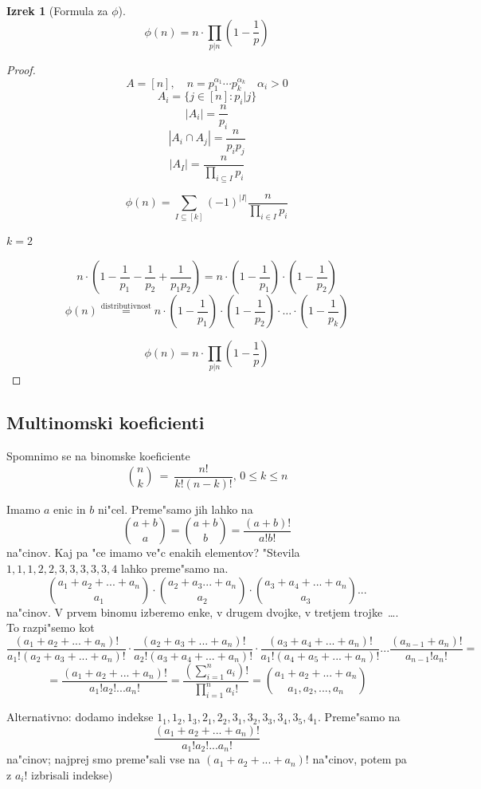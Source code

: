 \documentclass[a4paper,12pt]{article}
\theoremstyle{definition}
\newtheorem{theorem}[counter]{Izrek}
\theoremstyle{remark}
\begin{document}
\begin{theorem}[Formula za $\phi$]
	\[\phi (n) = n \cdot \prod_{p | n} (1 - \frac{1}{p})\]
\end{theorem}
\begin{proof}
	\[A = [n], \quad n = p_1^{\alpha_1} \cdots p_k^{\alpha_k} \quad \alpha_i > 0\]
	\[A_i = \{j \in [n] : p_i | j\} \]
	\[|A_i| = \frac{n}{p_i}\]
	\[|A_i \cap A_j| = \frac{n}{p_i p_j}\]
	\[|A_I| = \frac{n}{\displaystyle \prod_{i \subseteq I} p_i}\]

	\[\phi (n) = \sum_{I \subseteq [k]} (-1)^{|I|} \frac{n}{\displaystyle \prod_{i \in I} p_i}\]

		$k = 2$ \label{TODO: k=2? kasn k? od kje? kaj to pomen}

	\[n\cdot(1 - \frac{1}{p_1} - \frac{1}{p_2} + \frac{1}{p_1 p_2}) = n\cdot(1 - \frac{1}{p_1})\cdot(1 - \frac{1}{p_2})\]
	\[\phi (n) \stackrel{\text{distributivnost}}{=}  n\cdot(1 - \frac{1}{p_1})\cdot(1 - \frac{1}{p_2})\cdot \ldots \cdot(1 - \frac{1}{p_k})\]

	\[\phi (n) = n \cdot \prod_{p | n} (1 - \frac{1}{p})\]
\end{proof}

\subsection{Multinomski koeficienti}
Spomnimo se na binomske koeficiente
\[\binom{n}{k} \ = \ \frac{n!}{k! (n - k)!}\text{, } 0 \leqslant k \leqslant n\]

Imamo $a$ enic in $b$ ni"cel. Preme"samo jih lahko na
\[\binom{a + b}{a} = \binom{a + b}{b} = \frac{(a+b)!}{a!b!}\]
na"cinov. Kaj pa "ce imamo ve"c enakih elementov? "Stevila $1,1,1,2,2,3,3,3,3,3,4$ lahko preme"samo na.
\[\binom{a_1 + a_2 + ... + a_n}{a_1} \cdot \binom{a_2 + a_3 ... + a_n}{a_2} \cdot \binom{a_3 + a_4 + ... + a_n}{a_3} ...\]
na"cinov. V prvem binomu izberemo enke, v drugem dvojke, v tretjem trojke~\ldots. To razpi"semo kot
\[\frac{(a_1 + a_2 + ... + a_n)!}{a_1!(a_2 + a_3 + ... + a_n)!} \cdot \frac{(a_2 + a_3 + ... + a_n)!}{a_2!(a_3 + a_4 + ... + a_n)!} \cdot \frac{(a_3 + a_4 + ... + a_n)!}{a_1!(a_4 + a_5 + ... + a_n)!} ... \frac{(a_{n-1}+a_n)!}{a_{n-1}!a_n!} =\]
\[= \frac{(a_1 + a_2 + ... + a_n)!}{a_1!a_2!...a_n!} = \frac{(\displaystyle \sum_{i = 1}^n a_i)!}{\displaystyle \prod_{i = 1}^n a_i!} = \binom{a_1 + a_2 + ... + a_n}{a_1, a_2, ..., a_n}\]

Alternativno: dodamo indekse $1_1, 1_2, 1_3, 2_1, 2_2, 3_1, 3_2, 3_3, 3_4, 3_5, 4_1$. Preme"samo na
\[\frac{(a_1 + a_2 + ... + a_n)!}{a_1!a_2!...a_n!}\]
na"cinov; najprej smo preme"sali vse na $(a_1 + a_2 + ... + a_n)!$ na"cinov, potem pa z $a_i!$ izbrisali indekse)\\
\end{document}
